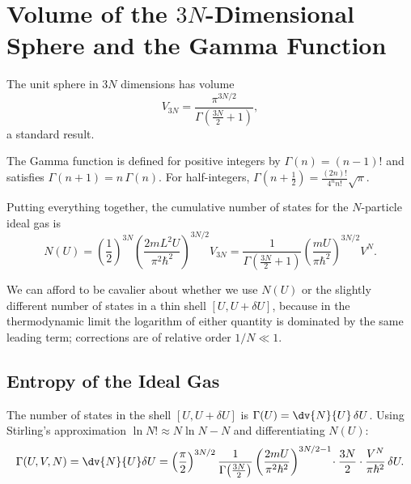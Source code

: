 
\section{Volume of the $3N$-Dimensional Sphere and the Gamma Function}

The unit sphere in $3N$ dimensions has volume
\begin{equation}
    V_{3N} = \frac{\pi^{3N/2}}{\Gamma\!\left(\frac{3N}{2} + 1\right)},
\end{equation}
a standard result.

\begin{definition}
The Gamma function is defined for positive integers by $\Gamma(n) = (n-1)!$ and satisfies $\Gamma(n+1) = n\,\Gamma(n)$. For half-integers, $\Gamma\!\left(n + \tfrac{1}{2}\right) = \frac{(2n)!}{4^n n!}\sqrt{\pi}$.
\end{definition}

Putting everything together, the cumulative number of states for the $N$-particle ideal gas is
\begin{equation}
    N(U) = \left(\frac{1}{2}\right)^{3N}\left(\frac{2mL^2 U}{\pi^2\hbar^2}\right)^{3N/2}V_{3N}
          = \frac{1}{\Gamma\!\left(\frac{3N}{2}+1\right)}\left(\frac{mU}{\pi\hbar^2}\right)^{3N/2}V^N.
\end{equation}

We can afford to be cavalier about whether we use $N(U)$ or the slightly different number of states in a thin shell $[U, U+\delta U]$, because in the thermodynamic limit the logarithm of either quantity is dominated by the same leading term; corrections are of relative order $1/N \ll 1$.

\subsection{Entropy of the Ideal Gas}

The number of states in the shell $[U, U + \delta U]$ is $\Gamma(U) = \dv{N}{U}\,\delta U$. Using Stirling's approximation $\ln N! \approx N\ln N - N$ and differentiating $N(U)$:
\begin{equation}
    \Gamma(U, V, N) = \dv{N}{U}\delta U = \left(\frac{\pi}{2}\right)^{3N/2}\frac{1}{\Gamma\!\left(\frac{3N}{2}\right)}\left(\frac{2mU}{\pi^2\hbar^2}\right)^{3N/2-1}\!\cdot\frac{3N}{2}\cdot\frac{V^N}{\pi\hbar^2}\,\delta U.
\end{equation}

